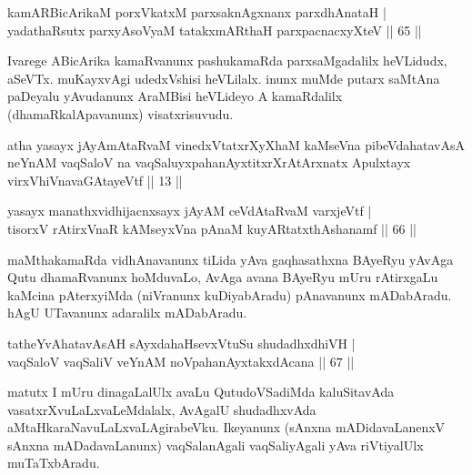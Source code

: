 
\begin{shl}
kamAR\s \s BicArikaM porxVkatxM parxsaknAgxnanx parxdhAnataH | \\
yadathaRsutx parxyAsoV\s yaM tatakxmARthaH parxpacnacxyXteV \hfill|| 65 || 
\end{shl}

\begin{artha}
Ivarege ABicArika kamaRvanunx pashukamaRda parxsaMgadalilx heVLidudx, aSeVTx. muKayxvAgi udedxVshisi heVLilalx. inunx muMde putarx saMtAna paDeyalu yAvudanunx AraMBisi heVLideyo A kamaRdalilx (dhamaRkalApavanunx) visatxrisuvudu.
\end{artha}

\begin{kandikeshl}
atha yasayx jAyAmAtaRvaM vinedxVtatxrXyXhaM kaMseVna pibeVdahatavAsA neYnAM vaqSaloV na vaqSaluyxpahanAyxtitxrXrAtArxnatx Apulxtayx virxVhiVnavaGAtayeVtf || 13 ||
\end{kandikeshl}

\begin{shl}
yasayx manathxvidhijacnxsayx jAyAM ceVdAtaRvaM varxjeVtf | \\
tisorxV rAtirxVnaR kAMseyxVna pAnaM kuyARtatxthA\s shanamf  \hfill|| 66 || 
\end{shl}

\begin{artha}
maMthakamaRda vidhAnavanunx tiLida yAva gaqhasathxna BAyeRyu yAvAga 
Qutu dhamaRvanunx hoMduvaLo, AvAga avana BAyeRyu mUru rAtirxgaLu 
kaMcina pAterxyiMda (niVranunx kuDiyabAradu) pAnavanunx mADabAradu. 
hAgU UTavanunx adaralilx mADabAradu.
\end{artha}


\begin{shl}
tatheYvAhatavAsAH sAyxdahaHsevxVtuSu shudadhxdhiVH | \\
vaqSaloV vaqSaliV veYnAM noVpahanAyxtakxdAcana \hfill|| 67 || 
\end{shl}

\begin{artha}
matutx I mUru dinagaLalUlx avaLu QutudoVSadiMda kaluSitavAda vasatxrXvuLaLxvaLeMdalalx, AvAgalU shudadhxvAda aMtaHkaraNavuLaLxvaLAgirabeVku. Ikeyanunx (sAnxna mADidavaLanenxV sAnxna mADadavaLanunx) vaqSalanAgali vaqSaliyAgali yAva riVtiyalUlx muTaTxbAradu.
\end{artha}

